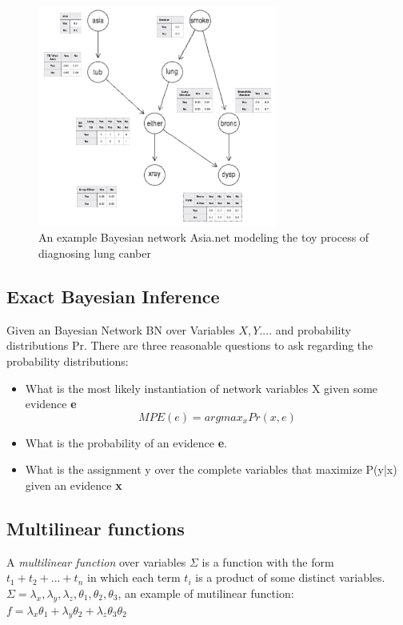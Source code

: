     \begin{figure}
        \centering
        \includegraphics[width = 0.7\textwidth]{pic/full-asia.png}
        \caption{An example Bayesian network Asia.net modeling the toy process of diagnosing lung canber}
        \label{fig:asia-net}
    \end{figure}
    
    \subsection{Exact Bayesian Inference}
    Given an Bayesian Network BN over Variables ${X, Y...}$. and probability distributions Pr. There are three reasonable questions to ask regarding the probability distributions:
    \begin{itemize}
        \item What is the most likely instantiation of network variables X given some evidence \textbf{e}
        $$MPE(e) = argmax_{x} Pr(x, e)$$
        \item What is the probability of an evidence \textbf{e}.
        \item What is the assignment y over the complete variables that maximize P(y|x) given an evidence \textbf{x}
    \end{itemize}
    \subsection{Multi\-linear functions}
    A \textit{multi\-linear function} over variables $\Sigma$ is a function
    with the form $t_{1} + t_{2} + ... + t_{n}$ in which each term $t_{i}$ is a product of some distinct variables. \\
    $\Sigma = \lambda_{x}, \lambda_{y}, \lambda_{z}, \theta_{1}, \theta_{2}, \theta_{3}$, an example of muti\-linear function: $f = \lambda_{x}\theta_{1} + \lambda_{y}\theta_{2} + \lambda_{z}\theta_{3}\theta_{2}$
